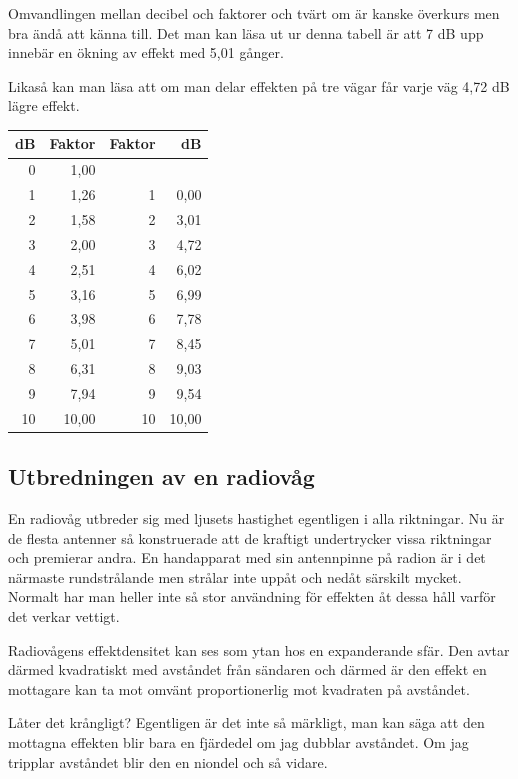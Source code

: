 Omvandlingen mellan decibel och faktorer och tvärt om är kanske överkurs men bra ändå att känna till. Det man kan läsa ut ur denna tabell är att 7 dB upp innebär en ökning av effekt med 5,01 gånger.

Likaså kan man läsa att om man delar effekten på tre vägar får varje väg 4,72 dB lägre effekt.

\begin{table}[H]
	\centering
	\begin{tabular}{rr|rr}
		dB & Faktor & Faktor &    dB \\ \hline
		 0 &   1,00 &        &       \\
		 1 &   1,26 &      1 &  0,00 \\
		 2 &   1,58 &      2 &  3,01 \\
		 3 &   2,00 &      3 &  4,72 \\
		 4 &   2,51 &      4 &  6,02 \\
		 5 &   3,16 &      5 &  6,99 \\
		 6 &   3,98 &      6 &  7,78 \\
		 7 &   5,01 &      7 &  8,45 \\
		 8 &   6,31 &      8 &  9,03 \\
		 9 &   7,94 &      9 &  9,54 \\
		10 &  10,00 &     10 & 10,00
	\end{tabular}
\end{table}

\subsection{Utbredningen av en radiovåg}

En radiovåg utbreder sig med ljusets hastighet egentligen i alla riktningar. Nu är de flesta antenner så konstruerade att de kraftigt undertrycker vissa riktningar och premierar andra. En handapparat med sin antennpinne på radion är i det närmaste rundstrålande men strålar inte uppåt och nedåt särskilt mycket. Normalt har man heller inte så stor användning för effekten åt dessa håll varför det verkar vettigt.

Radiovågens effektdensitet kan ses som ytan hos en expanderande sfär. Den avtar därmed kvadratiskt med avståndet från sändaren och därmed är den effekt en mottagare kan ta mot omvänt proportionerlig mot kvadraten på avståndet.

Låter det krångligt? Egentligen är det inte så märkligt, man kan säga att den mottagna effekten blir bara en fjärdedel om jag dubblar avståndet. Om jag tripplar avståndet blir den en niondel och så vidare.

